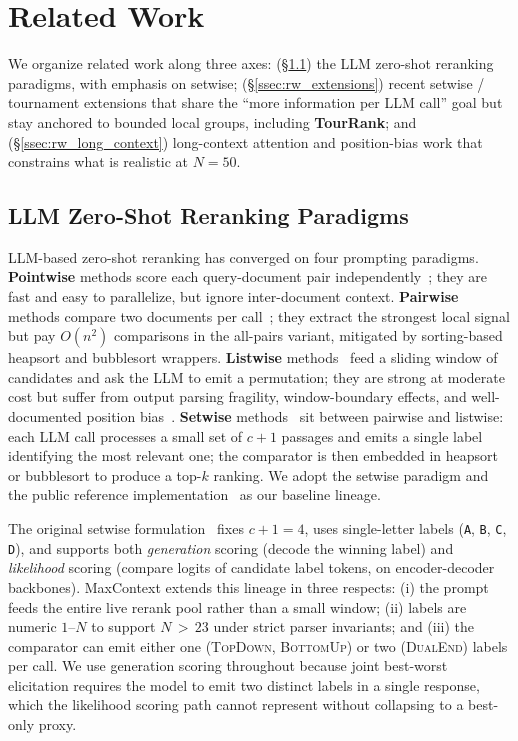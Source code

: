 \section{Related Work}
\label{sec:related_work}

We organize related work along three axes: (\S\ref{ssec:rw_paradigms}) the
LLM zero-shot reranking paradigms, with emphasis on setwise; (\S\ref{ssec:rw_extensions})
recent setwise / tournament extensions that share the ``more information per
LLM call'' goal but stay anchored to bounded local groups, including
\textbf{TourRank}; and (\S\ref{ssec:rw_long_context}) long-context attention
and position-bias work that constrains what is realistic at $N{=}50$.

\subsection{LLM Zero-Shot Reranking Paradigms}
\label{ssec:rw_paradigms}

LLM-based zero-shot reranking has converged on four prompting paradigms.
\textbf{Pointwise} methods score each query-document pair
independently~\citep{nogueira2020monot5,pradeep2021expandomonoduo}; they are
fast and easy to parallelize, but ignore inter-document context.
\textbf{Pairwise} methods compare two documents per
call~\citep{qin2024prp}; they extract the strongest local signal but pay
$O(n^2)$ comparisons in the all-pairs variant, mitigated by sorting-based
heapsort and bubblesort wrappers. \textbf{Listwise}
methods~\citep{sun2023rankgpt,ma2023zsl,zhang2025rankwithoutgpt,ren2025selfcalibrated}
feed a sliding window of candidates and ask the LLM to emit a permutation;
they are strong at moderate cost but suffer from output parsing fragility,
window-boundary effects, and well-documented position
bias~\citep{liu2024lostmiddle}. \textbf{Setwise}
methods~\citep{zhuang2024setwise} sit between pairwise and listwise: each
LLM call processes a small set of $c{+}1$ passages and emits a single label
identifying the most relevant one; the comparator is then embedded in
heapsort or bubblesort to produce a top-$k$ ranking. We adopt the setwise
paradigm and the public reference
implementation~\citep{ielab_llmrankers} as our baseline lineage.

The original setwise formulation~\citep{zhuang2024setwise} fixes
$c{+}1{=}4$, uses single-letter labels (\texttt{A}, \texttt{B}, \texttt{C},
\texttt{D}), and supports both \emph{generation} scoring (decode the winning
label) and \emph{likelihood} scoring (compare logits of candidate label
tokens, on encoder-decoder backbones). MaxContext extends this lineage in
three respects: (i) the prompt feeds the entire live rerank pool rather than
a small window; (ii) labels are numeric $1$--$N$ to support
$N{\,>\,}23$ under strict parser invariants; and (iii) the comparator can
emit either one (\textsc{TopDown}, \textsc{BottomUp}) or two
(\textsc{DualEnd}) labels per call. We use generation scoring throughout
because joint best-worst elicitation requires the model to emit two distinct
labels in a single response, which the likelihood scoring path cannot
represent without collapsing to a best-only proxy.

